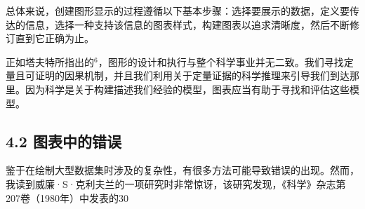 总体来说，创建图形显示的过程遵循以下基本步骤：选择要展示的数据，定义要传达的信息，选择一种支持该信息的图表样式，构建图表以追求清晰度，然后不断修订直到它正确为止。

正如塔夫特所指出的${ }^{6}$，图形的设计和执行与整个科学事业并无二致。我们寻找定量且可证明的因果机制，并且我们利用关于定量证据的科学推理来引导我们到达那里。因为科学是关于构建描述我们经验的模型，图表应当有助于寻找和评估这些模型。

\subsection*{4.2 图表中的错误}
鉴于在绘制大型数据集时涉及的复杂性，有很多方法可能导致错误的出现。然而，我读到威廉·S·克利夫兰的一项研究时非常惊讶，该研究发现，《科学》杂志第207卷（1980年）中发表的30%

